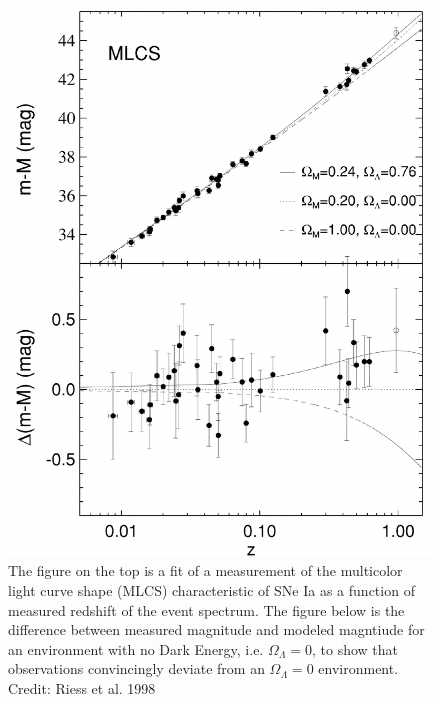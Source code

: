 \documentclass{paper}
\begin{document}
  \begin{figure}[!htb]
    \begin{centering}
    \includegraphics[scale=0.4]{DE-sn_lightcurve.pdf}
    \caption{The figure on the top is a fit of a measurement of the multicolor 
      light curve shape (MLCS) characteristic of SNe Ia as a function of 
      measured redshift of the event spectrum. The figure below is the
      difference between measured magnitude and modeled magntiude for an 
      environment with no Dark Energy, i.e. \(\Omega_{\Lambda} = 0\), to show
      that observations convincingly deviate from an \(\Omega_{\Lambda} = 0\) 
      environment.
    Credit: Riess et al. 1998}
    \label{fig:DE-sn_lightcurve}
    \end{centering}
  \end{figure}


\end{document}
